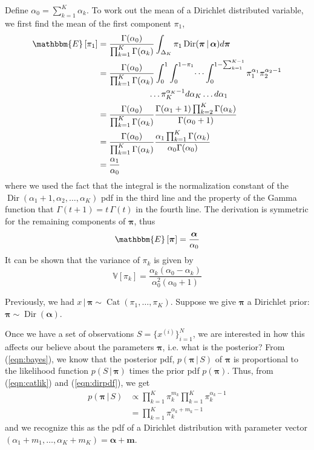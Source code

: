 \documentclass[final,3p,times,twocolumn]{elsarticle}
\DeclareMathOperator*{\Cat}{Cat}
\DeclareMathOperator*{\Dir}{Dir}
\let\bs\boldsymbol
\begin{document}
Define $\alpha_0 = \sum_{k=1}^K \alpha_k$. To work out the mean of a Dirichlet distributed variable, we first find the mean of the first component $\pi_1$,
\begin{equation*}
\begin{split}
\mathbbm{E}\left[\pi_1\right] &= \frac{\Gamma(\alpha_0)}{\prod_{k=1}^K\Gamma(\alpha_k)} \int\nolimits_{\Delta_K} \pi_1 \Dir(\bs \pi \,|\, \bs \alpha)d\bs\pi \\
&= \frac{\Gamma(\alpha_0)}{\prod_{k=1}^K\Gamma(\alpha_k)}\int_0^1\int_0^{1-\pi_1}\dots\int_0^{1-\sum_{k=1}^{K-1}}\pi_1^{\alpha_1}\pi_2^{\alpha_2-1} \\
&\qquad\qquad\qquad \dots\pi_K^{\alpha_K-1}d\alpha_K \dots d\alpha_1\\
&= \frac{\Gamma(\alpha_0)}{\prod_{k=1}^K\Gamma(\alpha_k)} \frac{\Gamma(\alpha_1+1)\prod_{k=2}^K\Gamma(\alpha_k)}{\Gamma(\alpha_0+1)}\\
&= \frac{\Gamma(\alpha_0)}{\prod_{k=1}^K\Gamma(\alpha_k)} \frac{\alpha_1\prod_{k=1}^K\Gamma(\alpha_k)}{\alpha_0 \Gamma(\alpha_0)}\\
&= \frac{\alpha_1}{\alpha_0}
\end{split}
\end{equation*}
where we used the fact that the integral is the normalization constant of the $\Dir(\alpha_1+1,\alpha_2,\dots,\alpha_K)$ pdf in the third line and the property of the Gamma function that $\Gamma(t+1)=t\,\Gamma(t)$ in the fourth line. 
The derivation is symmetric for the remaining components of $\bs \pi$, thus 
\begin{equation*}
\mathbbm{E}\left[\bs \pi \right] = \frac{\bs \alpha}{\alpha_0}
\end{equation*}
It can be shown that the variance of $\pi_k$ is given by
\begin{equation*}
\mathbb{V}\left[\pi_k\right] = \frac{\alpha_k (\alpha_0-\alpha_k)}{\alpha_0^2(\alpha_0+1)}
\end{equation*}

Previously, we had $x\,|\,\bs \pi \sim \Cat(\pi_1,\dots,\pi_K)$.
Suppose we give $\bs \pi$ a Dirichlet prior: $\bs \pi \sim \Dir(\bs \alpha)$.

Once we have a set of observations $S = \{x^{(i)}\}_{i=1}^N$, we are interested in how this affects our believe about the parameters $\bs \pi$, i.e. what is the posterior?
From (\ref{eqn:bayes}), we know that the posterior pdf, $p(\bs \pi \,|\, S)$ of $\bs \pi$ is proportional to the likelihood function $p(S\,|\,\bs \pi)$ times the prior pdf $p(\bs \pi)$.
Thus, from (\ref{eqn:catlik}) and (\ref{eqn:dirpdf}), we get
\begin{equation*}
\begin{split}
p(\bs \pi \,|\, S) &\propto \prod\nolimits_{k=1}^K\pi_k^{m_k} \prod\nolimits_{k=1}^K \pi_k^{\alpha_k - 1}\\
	&= \prod\nolimits_{k=1}^K \pi_k^{\alpha_k+m_k-1}
\end{split}
\end{equation*}
and we recognize this as the pdf of a Dirichlet distribution with parameter vector $(\alpha_1+m_1,\dots,\alpha_K+m_K) = \bs \alpha + \bs m$.
\end{document}
